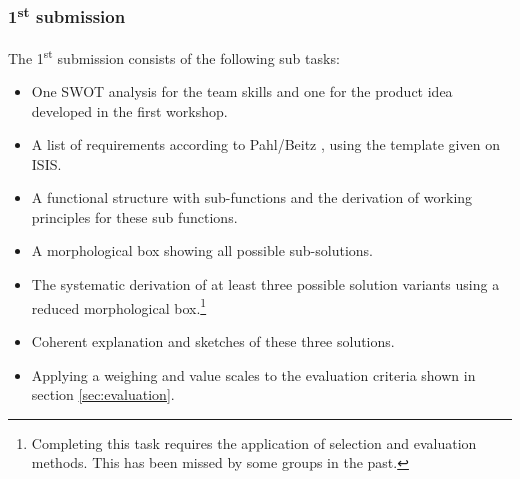 \documentclass[headinclude=true]{scrartcl}
\begin{document}
\subsubsection{1\textsuperscript{st} submission}
The 1\textsuperscript{st} submission consists of the following sub tasks:
\begin{itemize}
 \item One SWOT analysis for the team skills and one for the product idea developed in the first workshop.
 \item A list of requirements according to Pahl/Beitz \cite{Pahl2007}, using the template given on ISIS.
 \item A functional structure with sub-functions and the derivation of working principles for these sub functions.
 \item A morphological box showing all possible sub-solutions.
 \item The systematic derivation of at least three possible solution variants using a reduced morphological box.\footnote{Completing this task requires the application of selection and evaluation methods. This has been missed by some groups in the past.}
 \item Coherent explanation and sketches of these three solutions.
 \item Applying a weighing and value scales to the evaluation criteria shown in section \ref{sec:evaluation}.
\end{itemize}
\end{document}
